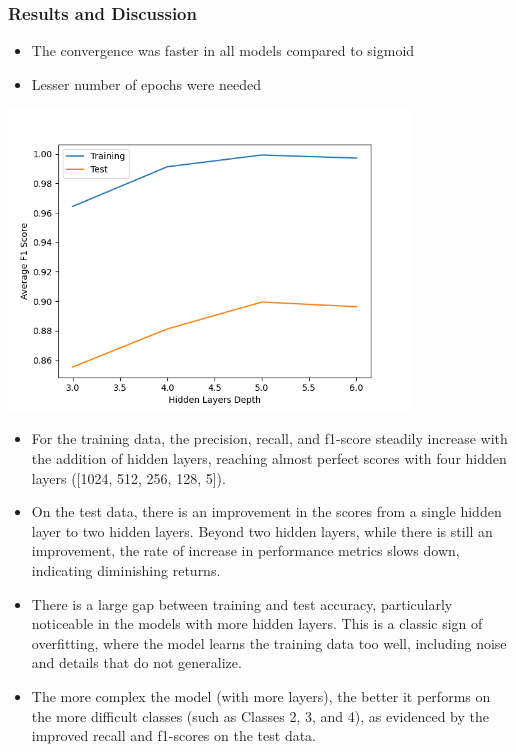 \documentclass[12pt]{article}
\begin{document}
\subsubsection{Results and Discussion}

\begin{itemize}
    \item The convergence was faster in all models compared to sigmoid
    \item Lesser number of epochs were needed
\end{itemize}

\begin{center}
    \includegraphics[width=0.8\textwidth]{Assignment 3/q2/(e) relu adaptive training f1 vs hidden_depth.png}
\end{center}

\begin{itemize}
    \item For the training data, the precision, recall, and f1-score steadily increase with the addition of hidden layers, reaching almost perfect scores with four hidden layers ([1024, 512, 256, 128, 5]).
    \item On the test data, there is an improvement in the scores from a single hidden layer to two hidden layers. Beyond two hidden layers, while there is still an improvement, the rate of increase in performance metrics slows down, indicating diminishing returns.
    \item There is a large gap between training and test accuracy, particularly noticeable in the models with more hidden layers. This is a classic sign of overfitting, where the model learns the training data too well, including noise and details that do not generalize.
    \item The more complex the model (with more layers), the better it performs on the more difficult classes (such as Classes 2, 3, and 4), as evidenced by the improved recall and f1-scores on the test data.
\end{itemize}
\end{document}
